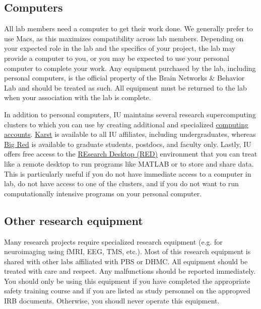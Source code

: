 \documentclass{tufte-book} %
\begin{document}
 \subsection{Computers}
All lab members need a computer to get their work done. We generally prefer to use Macs, as this maximizes compatibility across lab members. Depending on your expected role in the lab and the specifics of your project, the lab may provide a computer to you, or you may be expected to use your personal computer to complete your work. Any equipment purchased by the lab, including personal computers, is the official property of the Brain Networks \& Behavior Lab and should be treated as such. All equipment must be returned to the lab when your association with the lab is complete.

In addition to personal computers, IU maintains several research supercomputing clusters to which you can use by creating additional and specialized \href{https://kb.iu.edu/d/aczn#research}{computing accounts}. \href{https://kb.iu.edu/d/bezu}{Karst} is available to all IU affiliates, including undergraduates, whereas \href{https://kb.iu.edu/d/bcqt}{Big Red} is available to graduate students, postdocs, and faculty only. Lastly, IU offers free access to the \href{https://kb.iu.edu/d/apum}{REsearch Desktop (RED)} environment that you can treat like a remote desktop to run programs like MATLAB or to store and share data. This is particularly useful if you do not have immediate access to a computer in lab, do not have access to one of the clusters, and if you do not want to run computationally intensive programs on your personal computer.


 \subsection{Other research equipment}
 Many research projects require specialized research equipment (e.g. for neuroimaging using fMRI, EEG, TMS, etc.). Most of this research equipment is shared with other labs affiliated with PBS or DHMC. All equipment should be treated with care and respect. Any malfunctions should be reported immediately. You should only be using this equipment if you have completed the appropriate safety training course and if you are listed as study personnel on the appropved IRB documents. Otherwise, you shoudl never operate this equipment.
\end{document}
